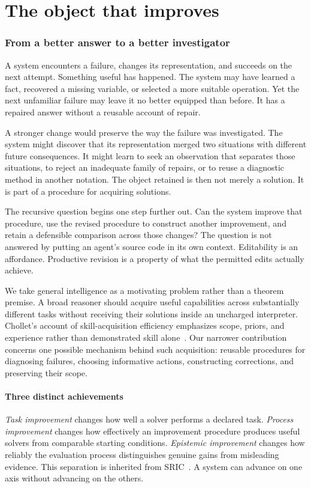 \documentclass[11pt,letterpaper]{article}
\theoremstyle{plain}
\theoremstyle{definition}
\begin{document}
\part{The object that improves}
\section{From a better answer to a better investigator}\label{sec:introduction}
A system encounters a failure, changes its representation, and succeeds on the next attempt. Something useful has happened. The system may have learned a fact, recovered a missing variable, or selected a more suitable operation. Yet the next unfamiliar failure may leave it no better equipped than before. It has a repaired answer without a reusable account of repair.

A stronger change would preserve the way the failure was investigated. The system might discover that its representation merged two situations with different future consequences. It might learn to seek an observation that separates those situations, to reject an inadequate family of repairs, or to reuse a diagnostic method in another notation. The object retained is then not merely a solution. It is part of a procedure for acquiring solutions.

The recursive question begins one step further out. Can the system improve that procedure, use the revised procedure to construct another improvement, and retain a defensible comparison across those changes? The question is not answered by putting an agent's source code in its own context. Editability is an affordance. Productive revision is a property of what the permitted edits actually achieve.

We take general intelligence as a motivating problem rather than a theorem premise. A broad reasoner should acquire useful capabilities across substantially different tasks without receiving their solutions inside an uncharged interpreter. Chollet's account of skill-acquisition efficiency emphasizes scope, priors, and experience rather than demonstrated skill alone~\cite{chollet}. Our narrower contribution concerns one possible mechanism behind such acquisition: reusable procedures for diagnosing failures, choosing informative actions, constructing corrections, and preserving their scope.

\subsection{Three distinct achievements}
\emph{Task improvement} changes how well a solver performs a declared task. \emph{Process improvement} changes how effectively an improvement procedure produces useful solvers from comparable starting conditions. \emph{Epistemic improvement} changes how reliably the evaluation process distinguishes genuine gains from misleading evidence. This separation is inherited from SRIC~\cite{sric}. A system can advance on one axis without advancing on the others.
\end{document}
